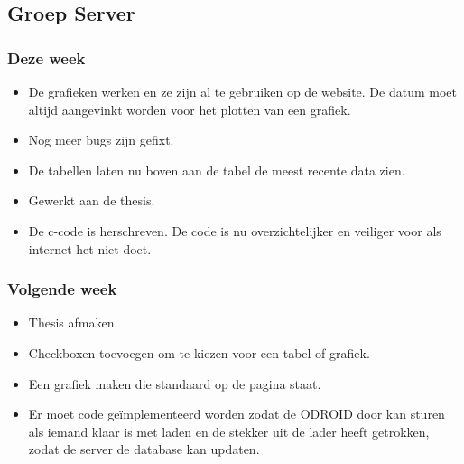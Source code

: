 \subsection*{Groep Server}
\subsubsection*{Deze week}
\begin{itemize}
\item De grafieken werken en ze zijn al te gebruiken op de website. De datum moet altijd aangevinkt worden voor het plotten van een grafiek.
\item Nog meer bugs zijn gefixt.
\item De tabellen laten nu boven aan de tabel de meest recente data zien.
\item Gewerkt aan de thesis.
\item De c-code is herschreven. De code is nu overzichtelijker en veiliger voor als internet het niet doet.
\end{itemize}
\subsubsection*{Volgende week}
\begin{itemize}
\item Thesis afmaken.
\item Checkboxen toevoegen om te kiezen voor een tabel of grafiek.
\item Een grafiek maken die standaard op de pagina staat.
\item Er moet code ge\"implementeerd worden zodat de ODROID door kan sturen als iemand klaar is met laden en de stekker uit de lader heeft getrokken, zodat de server de database kan updaten.
\end{itemize}
